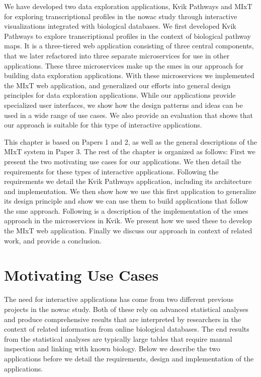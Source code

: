 We have developed two data exploration applications, Kvik
Pathways\cite{fjukstad2015kvik} and
MIxT\cite{fjukstad2017building,dumeaux2017interactions} for exploring
transcriptional profiles in the \gls{nowac} study through interactive
visualizations integrated with biological databases. We first developed Kvik
Pathways to explore transcriptional profiles in the context of biological
pathway maps. It is a three-tiered web application consisting of three central
components, that we later refactored into three separate microservices for use
in other applications. These three microservices make up the \glspl{sme} in our
approach for building data exploration applications.  With these microservices
we implemented the MIxT web application, and generalized our efforts into
general design principles for data exploration applications.  While our
applications provide specialized user interfaces, we show how the design
patterns and ideas can be used in a wide range of use cases. We also provide an
evaluation that shows that our approach is suitable for this type of interactive
applications. 

This chapter is based on Papers 1 and 2, as well as the general descriptions of
the MIxT system in Paper 3. 
The rest of the chapter is organized as follows: First we present the two
motivating use cases for our applications. We then detail the requirements for
these types of interactive applications. Following the requirements we detail
the Kvik Pathways application, including its architecture and implementation. We
then show how we use this first application to generalize its design principle
and show we can use them to build applications that follow the \gls{sme}
approach. Following is a description of the implementation of the \glspl{sme}
approach in the microservices in Kvik. We present how we used these to develop
the MIxT web application. Finally we discuss our approach in context of related
work, and provide a conclusion. 

\section{Motivating Use Cases}
The need for interactive applications has come from two different previous
projects in the \gls{nowac} study. Both of these rely on advanced statistical
analyses and produce comprehensive results that are interpreted by researchers
in the context of related information from online biological databases. The end
results from the statistical analyses are typically large tables that require
manual inspection and linking with known biology. Below we describe the two
applications before we detail the requirements, design and implementation of the
applications.

